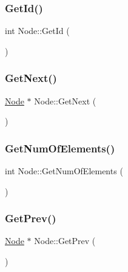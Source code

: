 \mbox{\label{class_node_ae90214a3ccf4ead8527329bbe238570c}} 
\subsubsection{\texorpdfstring{Get\+Id()}{GetId()}}
{\footnotesize\ttfamily int Node\+::\+Get\+Id (\begin{DoxyParamCaption}{ }\end{DoxyParamCaption})}

\mbox{\label{class_node_a6f8729374beb27838792dc6ef81124e8}} 
\subsubsection{\texorpdfstring{Get\+Next()}{GetNext()}}
{\footnotesize\ttfamily \hyperlink{class_node}{Node} $\ast$ Node\+::\+Get\+Next (\begin{DoxyParamCaption}{ }\end{DoxyParamCaption})}

\mbox{\label{class_node_a8759b5907bf04c1b9a43056409a59d35}} 
\subsubsection{\texorpdfstring{Get\+Num\+Of\+Elements()}{GetNumOfElements()}}
{\footnotesize\ttfamily int Node\+::\+Get\+Num\+Of\+Elements (\begin{DoxyParamCaption}{ }\end{DoxyParamCaption})}

\mbox{\label{class_node_a02f249f184a587e3353c911457f82ef8}} 
\subsubsection{\texorpdfstring{Get\+Prev()}{GetPrev()}}
{\footnotesize\ttfamily \hyperlink{class_node}{Node} $\ast$ Node\+::\+Get\+Prev (\begin{DoxyParamCaption}{ }\end{DoxyParamCaption})}

